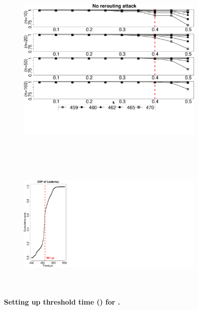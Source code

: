 \begin{figure}[t!]
    \centering
    \begin{subfigure}[t]{0.66\textwidth}
        \centering
         \includegraphics[trim={0 5cm 0 0}, clip, width=\linewidth]{data/graph/timeRound_new.pdf}
        \caption{\timeRoundCaption}
        \label{graph:diffTh}
    \end{subfigure}%
    ~ ~~
    \begin{subfigure}[t]{0.33\textwidth}
        \centering
        \includegraphics[trim={-0.6in 0cm 24cm 0}, clip, height=2.7in]{data/graph/CDF_Latency2.pdf}
        \caption{\cumulativeCaption}
        \label{fig:cdf}
    \end{subfigure}
    \caption{\textbf{Setting up threshold time (\connect) for \name.}}
\end{figure}

